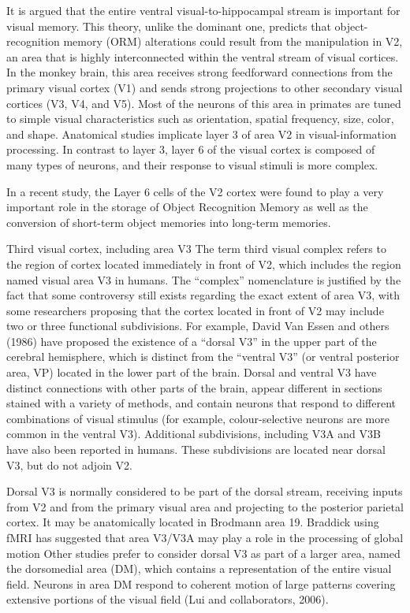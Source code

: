 It is argued that the entire ventral visual-to-hippocampal stream is important for visual memory. This theory, unlike the dominant one, predicts that object-recognition memory (ORM) alterations could result from the manipulation in V2, an area that is highly interconnected within the ventral stream of visual cortices. In the monkey brain, this area receives strong feedforward connections from the primary visual cortex (V1) and sends strong projections to other secondary visual cortices (V3, V4, and V5). Most of the neurons of this area in primates are tuned to simple visual characteristics such as orientation, spatial frequency, size, color, and shape. Anatomical studies implicate layer 3 of area V2 in visual-information processing. In contrast to layer 3, layer 6 of the visual cortex is composed of many types of neurons, and their response to visual stimuli is more complex.

In a recent study, the Layer 6 cells of the V2 cortex were found to play a very important role in the storage of Object Recognition Memory as well as the conversion of short-term object memories into long-term memories.

Third visual cortex, including area V3
The term third visual complex refers to the region of cortex located immediately in front of V2, which includes the region named visual area V3 in humans. The ``complex'' nomenclature is justified by the fact that some controversy still exists regarding the exact extent of area V3, with some researchers proposing that the cortex located in front of V2 may include two or three functional subdivisions. For example, David Van Essen and others (1986) have proposed the existence of a ``dorsal V3'' in the upper part of the cerebral hemisphere, which is distinct from the ``ventral V3'' (or ventral posterior area, VP) located in the lower part of the brain. Dorsal and ventral V3 have distinct connections with other parts of the brain, appear different in sections stained with a variety of methods, and contain neurons that respond to different combinations of visual stimulus (for example, colour-selective neurons are more common in the ventral V3). Additional subdivisions, including V3A and V3B have also been reported in humans. These subdivisions are located near dorsal V3, but do not adjoin V2.

Dorsal V3 is normally considered to be part of the dorsal stream, receiving inputs from V2 and from the primary visual area and projecting to the posterior parietal cortex. It may be anatomically located in Brodmann area 19. Braddick using fMRI has suggested that area V3/V3A may play a role in the processing of global motion Other studies prefer to consider dorsal V3 as part of a larger area, named the dorsomedial area (DM), which contains a representation of the entire visual field. Neurons in area DM respond to coherent motion of large patterns covering extensive portions of the visual field (Lui and collaborators, 2006).

